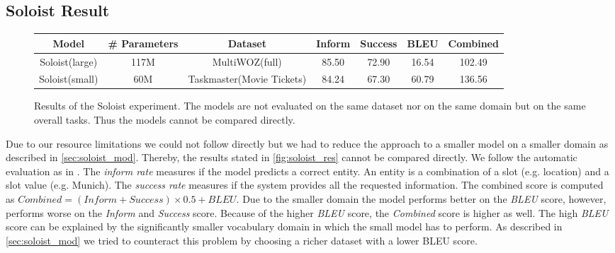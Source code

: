 \documentclass[twocolumn]{tum-article}
\begin{document}
\subsection{Soloist Result}
\begin{figure}[!h]
\centering
\begin{tabular}{c|c|c|c|c|c|c}
\hline
\textbf{Model} & \textbf{\# Parameters} & \textbf{Dataset} & \textbf{Inform} & \textbf{Success} & \textbf{BLEU} & \textbf{Combined}\\
\hline
Soloist(large) & 117M & MultiWOZ(full) & 85.50 & 72.90 & 16.54 & 102.49 \\
\hline
Soloist(small) & 60M & Taskmaster(Movie Tickets) & 84.24 & 67.30 & 60.79 & 136.56\\
\hline
\end{tabular}
\caption{Results of the Soloist experiment. The models are not evaluated on the same dataset nor on the same domain but on the same overall tasks. Thus the models cannot be compared directly. }
\label{fig:soloist_res}
\end{figure}
Due to our resource limitations we could not follow \cite{peng2020soloist} directly but we had to reduce the approach to a smaller model on a smaller domain as described in \autoref{sec:soloist_mod}. Thereby, the results stated in \autoref{fig:soloist_res} cannot be compared directly. 
We follow the automatic evaluation as in \cite{peng2020soloist, budzianowski2020multiwoz}. The \textit{inform rate} measures if the model predicts a correct entity. An entity is a combination of a slot (e.g. location) and a slot value (e.g. Munich). The \textit{success rate} measures if the system provides all the requested information. The combined score is computed as $Combined = (Inform + Success) \times 0.5 + BLEU$.
Due to the smaller domain the model performs better on the \textit{BLEU} score, however, performs worse on the \textit{Inform} and \textit{Success} score. Because of the higher \textit{BLEU} score, the \textit{Combined} score is higher as well. 
The high \textit{BLEU} score can be explained by the significantly smaller vocabulary domain in which the small model has to perform. As described in \autoref{sec:soloist_mod} we tried to counteract this problem by choosing a richer dataset with a lower BLEU score.  
\end{document}
